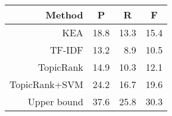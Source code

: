 
  \begin{table}[h]
    \centering
    \begin{tabular}{rrrr}
      \toprule
      Method & \multicolumn{1}{c}{P} & \multicolumn{1}{c}{R} & \multicolumn{1}{c}{F}\\
      \midrule
      KEA           & 18.8 & 13.3 & 15.4\\
      TF-IDF        & 13.2 & 8.9 & 10.5\\
      TopicRank     & 14.9 & 10.3 & 12.1\\
      TopicRank+SVM & 24.2 & 16.7 & 19.6\\
      \midrule
      Upper bound   & 37.6 & 25.8 & 30.3\\
      \bottomrule
    \end{tabular}
    \caption{
             \label{tab:state_of_the_art_comparison}}
  \end{table}


